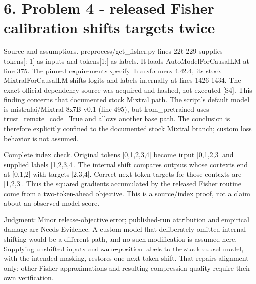 \documentclass[10pt]{article}
\begin{document}
\section*{6. Problem 4 - released Fisher calibration shifts targets twice}
Source and assumptions. preprocess/get\_fisher.py lines 226-229 supplies tokens[:-1] as inputs and tokens[1:] as labels. It loads AutoModelForCausalLM at line 375. The pinned requirements specify Transformers 4.42.4; its stock MixtralForCausalLM shifts logits and labels internally at lines 1426-1434. The exact official dependency source was acquired and hashed, not executed [S4]. This finding concerns that documented stock Mixtral path. The script’s default model is mistralai/Mixtral-8x7B-v0.1 (line 495), but from\_pretrained uses trust\_remote\_code=True and allows another base path. The conclusion is therefore explicitly confined to the documented stock Mixtral branch; custom loss behavior is not assumed.\par
Complete index check. Original tokens [0,1,2,3,4] become input [0,1,2,3] and supplied labels [1,2,3,4]. The internal shift compares outputs whose contexts end at [0,1,2] with targets [2,3,4]. Correct next-token targets for those contexts are [1,2,3]. Thus the squared gradients accumulated by the released Fisher routine come from a two-token-ahead objective. This is a source/index proof, not a claim about an observed model score.\par
Judgment: Minor release-objective error; published-run attribution and empirical damage are Needs Evidence. A custom model that deliberately omitted internal shifting would be a different path, and no such modification is assumed here. Supplying unshifted inputs and same-position labels to the stock causal model, with the intended masking, restores one next-token shift. That repairs alignment only; other Fisher approximations and resulting compression quality require their own verification.\par
\end{document}
